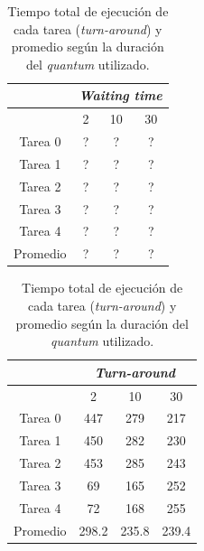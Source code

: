 \begin{table}[H]
  \center
  \begin{center}
  \begin{tabular}{c|c|c|c|}
    \cline{2-4}
    & \multicolumn{3}{|c|}{\cellcolor{LightCyan}\emph{Waiting time}} \\
    \hline
    \rowcolor{LightCyan}
    \multicolumn{1}{|c|}{Quantum} & 2 & 10 & 30 \\
    \hline
    \multicolumn{1}{|c|}{\cellcolor{LightCyan}Tarea 0} & ? & ? & ? \\
    \multicolumn{1}{|c|}{\cellcolor{LightCyan}Tarea 1} & ? & ? & ? \\
    \multicolumn{1}{|c|}{\cellcolor{LightCyan}Tarea 2} & ? & ? & ? \\
    \multicolumn{1}{|c|}{\cellcolor{LightCyan}Tarea 3} & ? & ? & ? \\
    \multicolumn{1}{|c|}{\cellcolor{LightCyan}Tarea 4} & ? & ? & ? \\
    \hline
    \multicolumn{1}{|c|}{\cellcolor{LightCyan}Promedio} & ? & ? & ? \\
    \hline
  \end{tabular}
  \end{center}
  \caption{\footnotesize Tiempo total de ejecución de cada tarea (\emph{turn-around}) y promedio según la duración del \emph{quantum} utilizado.}
  \label{tab:ej5-2}
\end{table}

\begin{table}[H]
  \center
  \begin{center}
  \begin{tabular}{c|c|c|c|}
    \cline{2-4}
    & \multicolumn{3}{|c|}{\cellcolor{LightCyan}\emph{Turn-around}} \\
    \hline
    \rowcolor{LightCyan}
    \multicolumn{1}{|c|}{Quantum} & 2 & 10 & 30 \\
    \hline
    \multicolumn{1}{|c|}{\cellcolor{LightCyan}Tarea 0} & 447 & 279 & 217 \\
    \multicolumn{1}{|c|}{\cellcolor{LightCyan}Tarea 1} & 450 & 282 & 230 \\
    \multicolumn{1}{|c|}{\cellcolor{LightCyan}Tarea 2} & 453 & 285 & 243 \\
    \multicolumn{1}{|c|}{\cellcolor{LightCyan}Tarea 3} & 69 & 165 & 252 \\
    \multicolumn{1}{|c|}{\cellcolor{LightCyan}Tarea 4} & 72 & 168 & 255 \\
    \hline
    \multicolumn{1}{|c|}{\cellcolor{LightCyan}Promedio} & 298.2 & 235.8 & 239.4 \\
    \hline
  \end{tabular}
  \end{center}
  \caption{\footnotesize Tiempo total de ejecución de cada tarea (\emph{turn-around}) y promedio según la duración del \emph{quantum} utilizado.}
  \label{tab:ej5-3}
\end{table}


